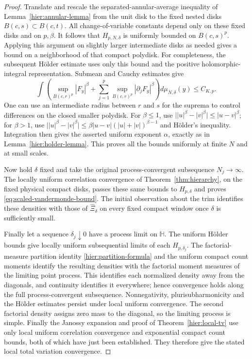 \documentclass[11pt,a4paper]{article}
\numberwithin{equation}{section}
\theoremstyle{definition}
\theoremstyle{remark}
\begin{document}
\begin{proof}
Translate and rescale the separated-annular-average inequality of
Lemma~\ref{hier:annular-lemma} from the unit disk to the fixed nested
disks $B(c,s)\subset B(c,t)$. All change-of-variable constants depend
only on these fixed disks and on $p,\beta$. It follows that
$H_{p,N,\delta}$ is uniformly bounded on $B(c,s)^p$. Applying this
argument on slightly larger intermediate disks as needed gives a
bound on a neighborhood of that compact polydisk. For completeness,
the subsequent H\"older estimate uses only this bound and the positive
holomorphic-integral representation. Submean and Cauchy estimates give
\[
 \int\left(\sup_{B(c,r)^p}|F_y|^\beta
       +\sum_{j=1}^p\sup_{B(c,r)^p}|\partial_jF_y|^\beta\right)
       d\mu_{N,\delta}(y)\le C_{K,p}.
\]
One can use an intermediate radius between $r$ and $s$ for the
suprema to control differences on the closed smaller polydisk.
For $\beta\le1$, use
$\big||u|^\beta-|v|^\beta\big|\le|u-v|^\beta$; for $\beta>1$, use
$\big||u|^\beta-|v|^\beta\big|
\le\beta|u-v|(|u|+|v|)^{\beta-1}$ and H\"older's inequality.
Integration then gives the asserted uniform exponent $\alpha$,
exactly as in Lemma~\ref{hier:holder-lemma}. This proves all the bounds
uniformly at finite $N$ and at small scales.

Now hold $\delta$ fixed and take the original process-convergent
subsequence $N_j\to\infty$. The locally uniform correlation convergence
of Theorem~\ref{thm:hierarchy}, on the fixed physical compact disks,
passes these same bounds to $H_{p,\delta}$ and proves
\eqref{eq:scaled-vandermonde-bound}. The initial observation about the
trim identifies these densities with those of $\widehat\Xi_\delta$
on every fixed compact window once $\delta$ is sufficiently small.

Finally let a sequence $\delta_j\downarrow0$ have a process limit on
$\mathbb H$. The uniform H\"older bounds give locally uniform
subsequential limits of each $H_{p,\delta_j}$. The factorial-measure
partition identity \eqref{hier:partition-formula} and the uniform
compact count moments identify the resulting densities with the
factorial moment measures of the limiting point process. This
identifies each normalized density away from the diagonals, and
continuity identifies it everywhere; hence convergence holds along
the full process-convergent subsequence. Nonnegativity,
plurisubharmonicity and the H\"older estimates persist under local
uniform convergence. The second factorial density assigns zero mass
to the diagonal, so the limiting process is simple. Finally the Janossy
expansion and proof of Theorem~\ref{hier:local-tv} use only local uniform
correlation convergence and exponential compact count bounds, both of
which have just been established. They therefore give the stated local
total variation convergence.
\end{proof}
\end{document}
